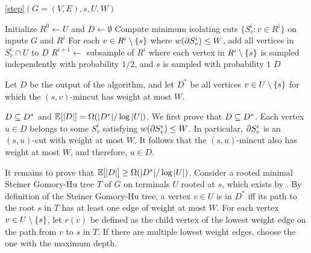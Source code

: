 
\begin{algorithm}
\caption{\ref{step}$(G=(V,E),s,U,W)$} 
\begin{algorithmic}[1]
\State Initialize $R^0\gets U$ and $D\gets\emptyset$
 \State Compute minimum isolating cuts $\{S^i_v:v\in R^i\}$ on inputs $G$ and $R^i$ 
 \State For each $v\in R^i\setminus \{s\}$ where $w(\partial S^i_v)\le W$, add all vertices in $S^i_v\cap U$ to $D$
 \State $R^{i+1}\gets$ subsample of $R^i$ where each vertex in $R^i\setminus \{s\}$ is sampled independently with probability $1/2$, and $s$ is sampled with probability $1$
\EndFor
\State\Return $D$
\end{algorithmic}
\end{algorithm}

Let $D$ be the output of the algorithm, and let $D^*$ be all vertices $v\in U\setminus \{s\}$ for which the $(s,v)$-mincut has weight at most $W$. 

\BL{}
$D\subseteq D^*$ and $\mathbb E[|D|] = \Omega(|D^*|/\log|U|)$. 
\EL
\BP
We first prove that $D\subseteq D^*$. Each vertex $u\in D$ belongs to some $S^i_v$ satisfying $w(\partial S^i_v)\le W$. %
In particular, $\partial S^i_v$ is an $(s,u)$-cut with weight at most $ W$. It follows that the $(s,u)$-mincut also has weight at most $ W$, and therefore, $u\in D$.

It remains to prove that $\mathbb E[|D|]\ge\Omega(|D^*|/\log|U|)$. Consider a rooted minimal Steiner Gomory-Hu tree $T$ of $G$ on terminals $U$ rooted at $s$, which exists by . By definition of the Steiner Gomory-Hu tree, a vertex $v\in U$ is in $D^*$ iff its path to the root $s$ in $T$ has at least one edge of weight at most $ W$. For each vertex $v\in U\setminus \{s\}$, let $r(v)$ be defined as the child vertex of the lowest weight edge on the path from $v$ to $s$ in $T$. If there are multiple lowest weight edges, choose the one with the maximum depth. %


